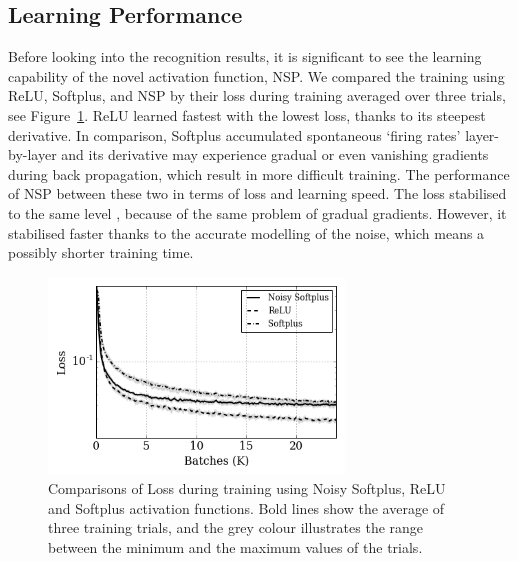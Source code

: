 	\subsection{Learning Performance}
	\label{subsec:result_compare}
	Before looking into the recognition results, it is significant to see the learning capability of the novel activation function, NSP.
	We compared the training using ReLU, Softplus, and NSP by their loss during training averaged over three trials, see Figure~\ref{Fig:loss_ns}.
	ReLU learned fastest with the lowest loss, thanks to its steepest derivative.
	In comparison, Softplus accumulated spontaneous `firing rates' layer-by-layer and its derivative may experience gradual or even vanishing gradients during back propagation, which result in \DIFdelbegin {}\DIFdelend more difficult training.
	The performance of NSP \DIFdelbegin {}\DIFdelend \DIFaddbegin {}\DIFaddend between these two in terms of loss and learning speed.
	The loss stabilised to the same level \DIFdelbegin {}\DIFdelend \DIFaddbegin {}\DIFaddend , because of the same problem of gradual gradients.
	However, it stabilised faster thanks to the accurate modelling of the noise, which means a possibly shorter training time.
	\begin{figure}[tbp!]
		\centering
		\includegraphics[width=0.7\textwidth]{pics_iconip/8.png}
		\caption{Comparisons of Loss during training using Noisy Softplus, ReLU and Softplus activation functions. Bold lines show the average of three training trials, and the grey colour illustrates the range between the minimum and the maximum values of the trials.  }
		\label{Fig:loss_ns}
	\end{figure}
